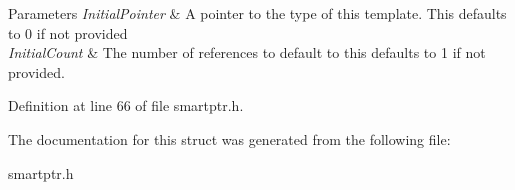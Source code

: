 \begin{DoxyParams}{Parameters}
{\em InitialPointer} & A pointer to the type of this template. This defaults to 0 if not provided \\
\hline
{\em InitialCount} & The number of references to default to this defaults to 1 if not provided. \\
\hline
\end{DoxyParams}


Definition at line 66 of file smartptr.h.



The documentation for this struct was generated from the following file:\begin{DoxyCompactItemize}
\item 
smartptr.h\end{DoxyCompactItemize}

